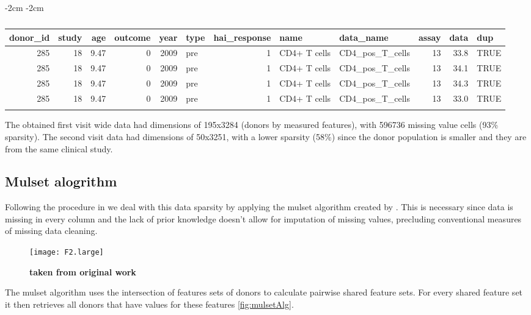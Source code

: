 \begin{table}
\addtolength{\leftskip} {-2cm} %
\addtolength{\rightskip} {-2cm} %
\begin{tabular}{rrrrrlrllrrl}
\toprule{}
donor\_id & study & age & outcome & year & type & hai\_response & name & data\_name & assay & data & dup\\
\midrule{}
285 & 18 & 9.47 & 0 & 2009 & pre & 1 & CD4+ T cells & CD4\_pos\_T\_cells & 13 & 33.8 & TRUE\\
285 & 18 & 9.47 & 0 & 2009 & pre & 1 & CD4+ T cells & CD4\_pos\_T\_cells & 13 & 34.1 & TRUE\\
285 & 18 & 9.47 & 0 & 2009 & pre & 1 & CD4+ T cells & CD4\_pos\_T\_cells & 13 & 34.3 & TRUE\\
285 & 18 & 9.47 & 0 & 2009 & pre & 1 & CD4+ T cells & CD4\_pos\_T\_cells & 13 & 33.0 & TRUE\\
\bottomrule{}
\end{tabular}
    \caption{}\label{tbl:exampleDuplicate}
\end{table}

The obtained first visit wide data had dimensions of 195x3284 (donors by
measured features), with 596736 missing value cells (93\% sparsity). The second
visit data had dimensions of 50x3251, with a lower sparsity (58\%) since the donor
population is smaller and they are from the same clinical study.

\subsection{Mulset alogrithm}

Following the procedure in \cite{tomicSIMONAutomatedMachine2019} we deal with
this data sparsity by applying the mulset algorithm created by
\cite{tomicSIMONAutomatedMachine2019}. This is necessary since data is missing
in every column and the lack of prior knowledge doesn't allow for imputation of
missing values, precluding conventional measures of missing data cleaning.

\begin{figure}[ht]
    \texttt{[image: F2.large]}
    \caption{\textbf{taken from original work}}\label{fig:mulsetAlg}
\end{figure}

The mulset algorithm uses the intersection of features sets of donors to
calculate pairwise shared feature sets. For every shared feature set it then
retrieves all donors that have values for these features \autoref{fig:mulsetAlg}.

